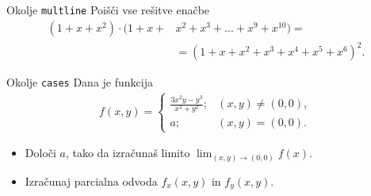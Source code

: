 \begin{frame}{Okolje \texttt{multline}}
	Poišči vse rešitve enačbe
	\begin{align*}
		(1+x+x^2) \cdot (1+x+&x^2+x^3+\ldots+x^9+x^{10}) =\\
		&=(1+x+x^2+x^3+x^4+x^5+x^6)^2.
	\end{align*}
	
\end{frame}

\begin{frame}{Okolje \texttt{cases}}
	Dana je funkcija		
		\begin{align*}
			f(x,y)=\begin{cases}
				\frac{3x^2y-y^3}{x^2+y^2}; &(x,y)\neq(0,0),\\
				a; &(x,y) = (0,0).
			\end{cases}
		\end{align*}

		
	\begin{itemize}
	\item Določi $a$, tako da izračunaš limito  $\lim_{(x,y)\to(0,0)} f(x).$
	\item Izračunaj parcialna odvoda $f_x(x,y)$ in $f_y(x,y)$.
	\end{itemize}
\end{frame}
